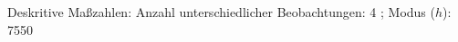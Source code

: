 				\label{tableValues:cjob049_g1}
				\vspace*{-\baselineskip}
                    \begin{noten}
                	    \note{} Deskritive Maßzahlen:
                	    Anzahl unterschiedlicher Beobachtungen: 4%
                	    ; 
                	      Modus ($h$): 7550
                     \end{noten}


